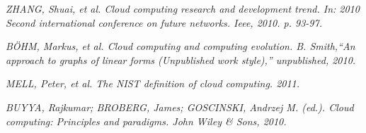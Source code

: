 \begin{thebibliography}{10}

	\emph{ZHANG, Shuai, et al. Cloud computing research and development trend. In: 2010 Second international conference on future networks. Ieee, 2010. p. 93-97.}

	\emph{BÖHM, Markus, et al. Cloud computing and computing evolution. B. Smith,“An approach to graphs of linear forms (Unpublished work style),” unpublished, 2010.}

	\emph{MELL, Peter, et al. The NIST definition of cloud computing. 2011.}

	\emph{BUYYA, Rajkumar; BROBERG, James; GOSCINSKI, Andrzej M. (ed.). Cloud computing: Principles and paradigms. John Wiley & Sons, 2010.}

\end{thebibliography}

